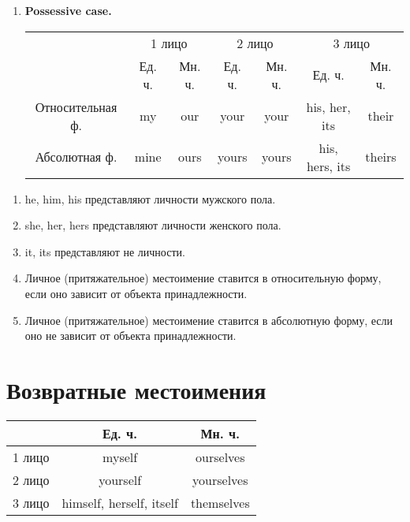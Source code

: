 \documentclass[oneside]{book}
\begin{document}
\begin{enumerate}
    \item \textbf{Possessive case.}
    \begin{center}
        \begin{tabular}{|c|cc|cc|cc|}
            \hline
            \multirow{2}{*}{}& \multicolumn{2}{c|}{1 лицо}         & \multicolumn{2}{c|}{2 лицо}          & \multicolumn{2}{c|}{3 лицо}                  \\ \cline{2-7} 
                             & \multicolumn{1}{c|}{Ед. ч.}& Мн. ч. & \multicolumn{1}{c|}{Ед. ч.} & Мн. ч. & \multicolumn{1}{c|}{Ед. ч.}         & Мн. ч. \\ \hline
            Относительная ф. & \multicolumn{1}{c|}{my}    & our    & \multicolumn{1}{c|}{your}   & your   & \multicolumn{1}{c|}{his, her, its}  & their  \\ \hline
            Абсолютная ф.    & \multicolumn{1}{c|}{mine}  & ours   & \multicolumn{1}{c|}{yours}  & yours  & \multicolumn{1}{c|}{his, hers, its} & theirs \\ \hline
        \end{tabular}
    \end{center}
\end{enumerate}

\begin{enumerate}
    \item he, him, his представляют личности мужского пола.

    \item she, her, hers представляют личности женского пола.

    \item it, its представляют не личности.

    \item Личное (притяжательное) местоимение
    ставится в относительную форму,
    если оно зависит от объекта
    принадлежности.

    \item Личное (притяжательное) местоимение
    ставится в абсолютную форму,
    если оно не зависит от объекта
    принадлежности.
\end{enumerate}

\section{Возвратные местоимения}
\begin{center}
    \begin{tabular}{|c|c|c|}
        \hline

        & Ед. ч. & Мн. ч.
        \\
        \hline

        1 лицо & myself & ourselves
        \\
        \hline

        2 лицо & yourself & yourselves
        \\
        \hline

        3 лицо & himself, herself, itself & themselves
        \\
        \hline
    \end{tabular}
\end{center}
\end{document}
